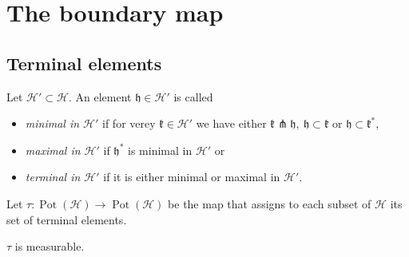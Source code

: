 \section{The boundary map}
\label{sec:map}

\subsection{Terminal elements}
\label{sec:treminal-elements}

\begin{defin}
  Let \(\mathcal{H}' \subset \mathcal{H}\). An element \(\mathfrak{h} \in \mathcal{H}'\) is called
  \begin{itemize}
  \item \emph{minimal in \(\mathcal{H}'\)} if for verey \(\mathfrak{k} \in \mathcal{H'}\) we have either \(\mathfrak{k} \pitchfork \mathfrak{h},\ \mathfrak{h} \subset \mathfrak{k}\) or \(\mathfrak{h} \subset \mathfrak{k}^\ast\),
  \item \emph{maximal in \(\mathcal{H}'\)} if \(\mathfrak{h}^\ast\) is minimal in \(\mathcal{H}'\) or
  \item \emph{terminal in \(\mathcal{H}'\)} if it is either minimal or maximal in \(\mathcal{H}'\).
  \end{itemize}
  Let \(\tau\colon \operatorname{Pot}(\mathcal{H}) \to \operatorname{Pot}(\mathcal{H})\) be the map that assigns to each subset of \(\mathcal{H}\) its set of terminal elements.
\end{defin}

\begin{lemma}
  \label{lem:tau}
  \(\tau\) is measurable.
\end{lemma}

